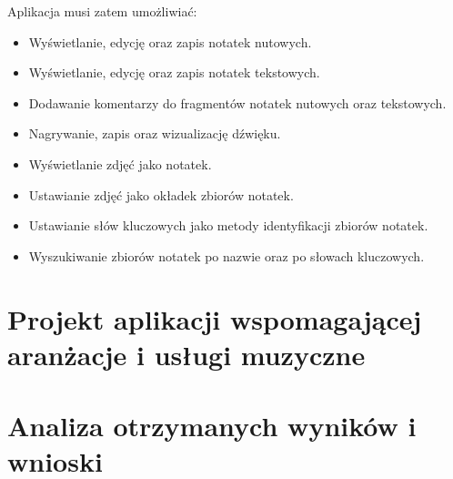 \documentclass[12pt]{article}
\begin{document}
Aplikacja musi zatem umożliwiać:
\begin{itemize}
	\item Wyświetlanie, edycję oraz zapis notatek nutowych.
	\item Wyświetlanie, edycję oraz zapis notatek tekstowych.
	\item Dodawanie komentarzy do fragmentów notatek nutowych oraz tekstowych.
	\item Nagrywanie, zapis oraz wizualizację dźwięku.
	\item Wyświetlanie zdjęć jako notatek.
	\item Ustawianie zdjęć jako okładek zbiorów notatek.
	\item Ustawianie słów kluczowych jako metody identyfikacji zbiorów notatek.
	\item Wyszukiwanie zbiorów notatek po nazwie oraz po słowach kluczowych.
\end{itemize}
\newpage


\section*{Projekt aplikacji wspomagającej aranżacje i usługi muzyczne}
\newpage

\section*{Analiza otrzymanych wyników i wnioski}
\newpage

\printbibliography
\newpage

\listoffigures
\newpage

\listoftables
\newpage
\end{document}
